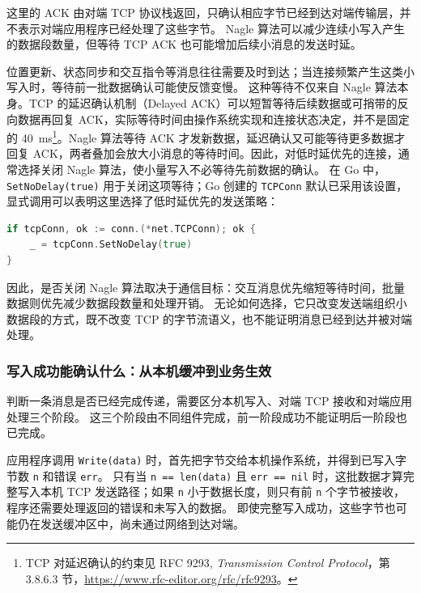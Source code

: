 这里的 ACK 由对端 TCP 协议栈返回，只确认相应字节已经到达对端传输层，并不表示对端应用程序已经处理了这些字节。
Nagle 算法可以减少连续小写入产生的数据段数量，但等待 TCP ACK 也可能增加后续小消息的发送时延。

位置更新、状态同步和交互指令等消息往往需要及时到达；当连接频繁产生这类小写入时，等待前一批数据确认可能使反馈变慢。
这种等待不仅来自 Nagle 算法本身。TCP 的延迟确认机制（Delayed ACK）可以短暂等待后续数据或可捎带的反向数据再回复 ACK，实际等待时间由操作系统实现和连接状态决定，并不是固定的 40~ms\footnote{TCP 对延迟确认的约束见 RFC 9293, \textit{Transmission Control Protocol}，第 3.8.6.3 节，\url{https://www.rfc-editor.org/rfc/rfc9293}。}。Nagle 算法等待 ACK 才发新数据，延迟确认又可能等待更多数据才回复 ACK，两者叠加会放大小消息的等待时间。因此，对低时延优先的连接，通常选择关闭 Nagle 算法，使小量写入不必等待先前数据的确认。
在 Go 中，\texttt{SetNoDelay(true)} 用于关闭这项等待；Go 创建的 \texttt{TCPConn} 默认已采用该设置，显式调用可以表明这里选择了低时延优先的发送策略：

\begin{tcolorbox}[title=降低小消息等待的 TCP 设置（概念示例）]
\begin{lstlisting}[style=codeblock, language=go]
if tcpConn, ok := conn.(*net.TCPConn); ok {
    _ = tcpConn.SetNoDelay(true)
}
\end{lstlisting}
\end{tcolorbox}

因此，是否关闭 Nagle 算法取决于通信目标：交互消息优先缩短等待时间，批量数据则优先减少数据段数量和处理开销。
无论如何选择，它只改变发送端组织小数据段的方式，既不改变 TCP 的字节流语义，也不能证明消息已经到达并被对端处理。

\subsubsection{写入成功能确认什么：从本机缓冲到业务生效}\label{sec2:write-not-delivered}

判断一条消息是否已经完成传递，需要区分本机写入、对端 TCP 接收和对端应用处理三个阶段。
这三个阶段由不同组件完成，前一阶段成功不能证明后一阶段也已完成。

应用程序调用 \texttt{Write(data)} 时，首先把字节交给本机操作系统，并得到已写入字节数 \texttt{n} 和错误 \texttt{err}。
只有当 \texttt{n == len(data)} 且 \texttt{err == nil} 时，这批数据才算完整写入本机 TCP 发送路径；如果 \texttt{n} 小于数据长度，则只有前 \texttt{n} 个字节被接收，程序还需要处理返回的错误和未写入的数据。
即使完整写入成功，这些字节也可能仍在发送缓冲区中，尚未通过网络到达对端。


